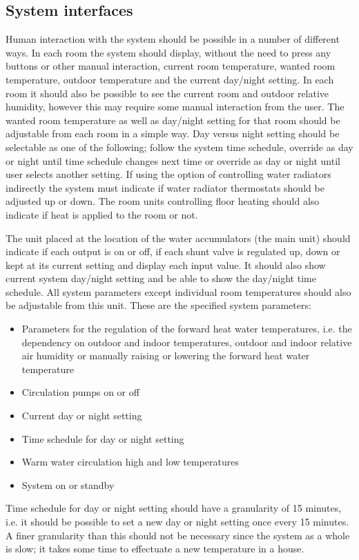 \subsection{System interfaces}
Human interaction with the system should be possible in a number of
different ways. In each room the system should display, without the
need to press any buttons or other manual interaction, current room
temperature, wanted room temperature, outdoor temperature and the
current day/night setting. In each room it should also be possible to
see the current room and outdoor relative humidity, however this may
require some manual interaction from the user. The wanted room
temperature as well as day/night setting for that room should be
adjustable from each room in a simple way. Day versus night setting
should be selectable as one of the following; follow the system time
schedule, override as day or night until time schedule changes next
time or override as day or night until user selects another
setting. If using the option of controlling water radiators indirectly
the system must indicate if water radiator thermostats should be
adjusted up or down. The room units controlling floor heating should
also indicate if heat is applied to the room or not.

The unit placed at the location of the water accumulators (the main
unit) should indicate if each output is on or off, if each shunt valve
is regulated up, down or kept at its current setting and display each
input value. It should also show current system day/night setting and
be able to show the day/night time schedule. All system parameters
except individual room temperatures should also be adjustable from
this unit. These are the specified system parameters:
\begin{itemize}
\item{Parameters for the regulation of the forward heat water
  temperatures, i.e. the dependency on outdoor and indoor
  temperatures, outdoor and indoor relative air humidity or manually
  raising or lowering the forward heat water temperature}
\item{Circulation pumps on or off}
\item{Current day or night setting}
\item{Time schedule for day or night setting} 
\item{Warm water circulation high and low temperatures}
\item{System on or standby}
\end{itemize}

Time schedule for day or night setting should have a granularity of 15
minutes, i.e. it should be possible to set a new day or night setting
once every 15 minutes. A finer granularity than this should not be
necessary since the system as a whole is slow; it takes some time to
effectuate a new temperature in a house. 

